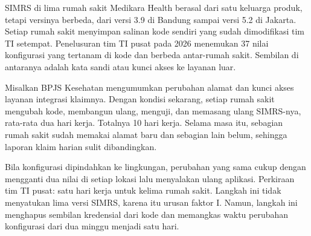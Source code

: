 \begin{kasus}[title={Kasus Medikara Health: Konfigurasi SIMRS di Lima Rumah Sakit}]
  SIMRS di lima rumah sakit Medikara Health berasal dari satu keluarga produk, tetapi
  versinya berbeda, dari versi 3.9 di Bandung sampai versi 5.2 di Jakarta. Setiap rumah
  sakit menyimpan salinan kode sendiri yang sudah dimodifikasi tim TI setempat. Penelusuran
  tim TI pusat pada 2026 menemukan 37 nilai konfigurasi yang tertanam di kode dan berbeda
  antar-rumah sakit. Sembilan di antaranya adalah kata sandi atau kunci akses ke layanan
  luar.

  Misalkan BPJS Kesehatan mengumumkan perubahan alamat dan kunci akses layanan integrasi
  klaimnya. Dengan kondisi sekarang, setiap rumah sakit mengubah kode, membangun ulang,
  menguji, dan memasang ulang SIMRS-nya, rata-rata dua hari kerja. Totalnya 10 hari kerja.
  Selama masa itu, sebagian rumah sakit sudah memakai alamat baru dan sebagian lain belum,
  sehingga laporan klaim harian sulit dibandingkan.

  Bila konfigurasi dipindahkan ke lingkungan, perubahan yang sama cukup dengan mengganti dua
  nilai di setiap lokasi lalu menyalakan ulang aplikasi. Perkiraan tim TI pusat: satu hari
  kerja untuk kelima rumah sakit. Langkah ini tidak menyatukan lima versi SIMRS, karena itu
  urusan faktor I. Namun, langkah ini menghapus sembilan kredensial dari kode dan memangkas
  waktu perubahan konfigurasi dari dua minggu menjadi satu hari.
\end{kasus}

